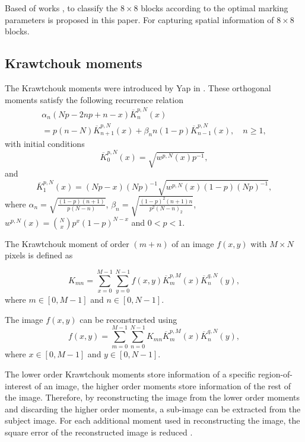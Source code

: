 \documentclass[runningheads]{llncs}
\begin{document}
Based of works \cite{avila2018watermarking}, to classify the $8\times 8$ blocks according to the optimal marking parameters is proposed in this paper. For capturing spatial information of $8\times 8$ blocks.

\subsection*{Krawtchouk moments}
The Krawtchouk moments were introduced by Yap in \cite{Yap2003}. These orthogonal moments satisfy the following recurrence relation
\begin{multline*}
\alpha_n(Np-2np+n-x)\overline{K}_{n}^{p,N}(x) \\= p(n-N)\overline{K}_{n+1}^{p,N}(x)+\beta_n n(1-p)\overline{K}_{n-1}^{p,N}(x),\quad n\geq 1,
\end{multline*}
with initial conditions 
\begin{equation*}
\overline{K}_{0}^{p,N}(x) = \sqrt{w^{p,N}(x)p^{-1}},
\end{equation*}	
and
\begin{equation*}
\overline{K}_{1}^{p,N}(x) = (Np-x)(Np)^{-1}\sqrt{w^{p,N}(x)(1-p)(Np)^{-1}},
\end{equation*}
where $\alpha_n = \sqrt{\frac{(1-p)(n+1)}{p(N-n)}}$, $\beta_n = \sqrt{\frac{(1-p)^2(n+1)n}{p^2(N-n)_2}}$, $w^{p,N}(x) = \binom{N}{x}p^x(1-p)^{N-x}$ and $0<p<1$.

The Krawtchouk moment of order $(m+n)$ of an image $f(x,y)$ with $M\times N$ pixels is defined as

\begin{equation}
K_{mn}=\sum_{x=0}^{M-1}\sum_{y=0}^{N-1}f(x,y)\overline{K}_{m}^{p,M}(x)\overline{K}_{n}^{q,N}(y),
\label{DKT}
\end{equation}
where $m\in \left[ 0,M-1\right] $ and $n\in \left[ 0,N-1\right] $.

The image $f(x,y)$ can be reconstructed using
\begin{equation}
f(x,y)=\sum_{m=0}^{M-1}\sum_{n=0}^{N-1}K_{mn}\overline{K}_{m}^{p,M}(x)\overline{K}_{n}^{q,N}(y),
\label{IDKT}
\end{equation}
where $x\in \left[ 0,M-1\right] $ and $y\in \left[ 0,N-1\right] $.

The lower order Krawtchouk moments store information of a specific region-of-interest of an image, the higher order moments store information of the rest of the image. Therefore, by reconstructing the image from the lower order moments and discarding the higher order moments, a sub-image can be extracted from the subject image. For each additional moment used in reconstructing the image, the square error of the reconstructed image is reduced \cite{Yap2003}.
\end{document}

